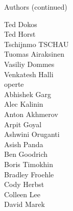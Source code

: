 \begin{frame}{Authors (continued)}
\begin{multicols}{5}
Ted Dokos\\
Ted Horst\\
Tschijnmo TSCHAU\\
Tuomas Airaksinen\\
Vasiliy Dommes\\
Venkatesh Halli\\
operte\\
Abhishek Garg\\
Alec Kalinin\\
Anton Akhmerov\\
Arpit Goyal\\
Ashwini Oruganti\\
Asish Panda\\
Ben Goodrich\\
Boris Timokhin\\
Bradley Froehle\\
Cody Herbst\\
Colleen Lee\\
David Marek\\
\end{multicols}
\end{frame}
